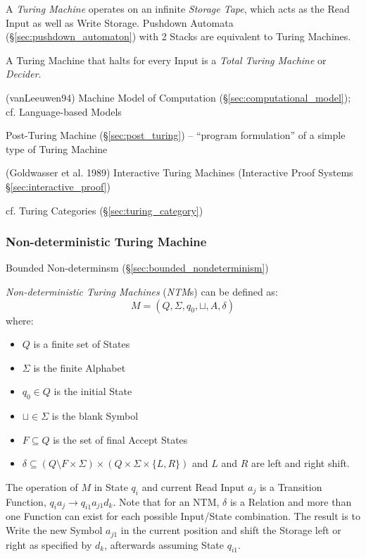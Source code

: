 A \emph{Turing Machine} operates on an infinite \emph{Storage Tape},
which acts as the Read Input as well as Write Storage. Pushdown
Automata (\S\ref{sec:pushdown_automaton}) with 2 Stacks are equivalent
to Turing Machines.

A Turing Machine that halts for every Input is a \emph{Total Turing
  Machine} or \emph{Decider}.

(vanLeeuwen94) Machine Model of Computation (\S\ref{sec:computational_model});
cf. Language-based Models

\fist Post-Turing Machine (\S\ref{sec:post_turing}) -- ``program formulation''
of a simple type of Turing Machine

\fist (Goldwasser et al. 1989) Interactive Turing Machines (Interactive Proof
Systems \S\ref{sec:interactive_proof})

\fist cf. Turing Categories (\S\ref{sec:turing_category})



\subsubsection{Non-deterministic Turing Machine}
\label{sec:nondeterministic_turing_machine}

\fist Bounded Non-determinsm (\S\ref{sec:bounded_nondeterminism})

\emph{Non-deterministic Turing Machines} (\emph{NTM}s) can be defined
as:
\[
  M = (Q, \Sigma, q_0, \sqcup, A, \delta)
\]
where:
\begin{itemize}
  \item $Q$ is a finite set of States
  \item $\Sigma$ is the finite Alphabet
  \item $q_0 \in Q$ is the initial State
  \item $\sqcup \in \Sigma$ is the blank Symbol
  \item $F \subseteq Q$ is the set of final Accept States
  \item $\delta \subseteq (Q \setminus F \times \Sigma) \times (Q
    \times \Sigma \times \{L,R\})$ and $L$ and $R$ are left and right
    shift.
\end{itemize}

The operation of $M$ in State $q_i$ and current Read Input $a_j$ is a
Transition Function, $q_i a_j \rightarrow q_{i1} a_{j1} d_k$. Note
that for an NTM, $\delta$ is a Relation and more than one Function can
exist for each possible Input/State combination. The result is to
Write the new Symbol $a_{j1}$ in the current position and shift the
Storage left or right as specified by $d_k$, afterwards assuming State
$q_{i1}$.




